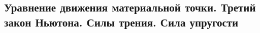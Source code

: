 \subsection{Уравнение движения материальной точки. Третий закон Ньютона. Силы трения. Сила упругости}

